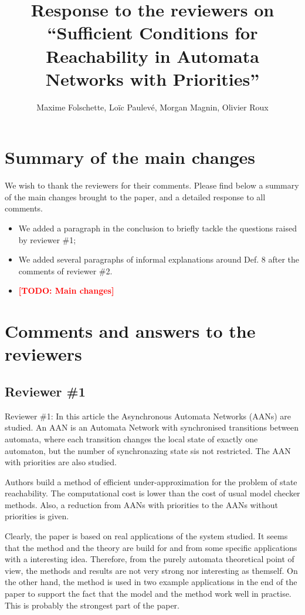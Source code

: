 \documentclass[11pt]{article}
\title{Response to the reviewers on “Sufficient Conditions for Reachability in Automata Networks with Priorities”}
\author{Maxime Folschette, Loïc Paulevé, Morgan Magnin, Olivier Roux}
\date{}
\newcommand{\todo}[1]{\textcolor{red}{\textbf{[TODO: #1]}}}
\begin{document}
\maketitle



\section*{Summary of the main changes}

We wish to thank the reviewers for their comments.
Please find below a summary of the main changes brought to the paper, and a detailed response to all comments.

\begin{itemize}
  \item We added a paragraph in the conclusion to briefly tackle the questions raised by reviewer \#1;
  \item We added several paragraphs of informal explanations around Def. 8 after the comments of reviewer \#2.
  \item \todo{Main changes}
\end{itemize}



\section*{Comments and answers to the reviewers}

\subsection*{Reviewer \#1}


Reviewer \#1: In this article the  Asynchronous Automata Networks (AANs) are studied. An AAN is an Automata Network with synchronised transitions between automata, where each transition changes the local state of exactly one automaton, but the number of synchronazing state sis not restricted.  The AAN with priorities are also studied. 

Authors build a method of efficient under-approximation for the problem of state reachability. The computational cost is lower than the cost of usual model checker methods. Also, a reduction from AANs with priorities to the AANs without priorities is given.

Clearly, the paper is based on real applications of the system studied. It seems that the method and the theory are build for and from some specific applications with a interesting idea. Therefore, from the purely automata theoretical point of view,  the methods and results are not very strong nor interesting as themself. On the other hand, the method is used in two example applications in the end of the paper to support the fact that the model and the method work well in practise. This is probably the strongest part of the paper.  
\end{document}
